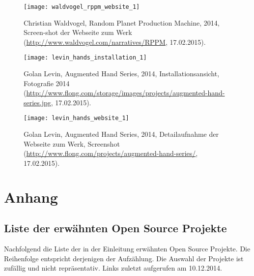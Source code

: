 \documentclass[
paper=164mm:234mm, %
pagesize, %
DIV=calc, %
10pt, %
BCOR=0mm, %
parskip=half- %
]{scrbook}
\begin{document}
\begin{figure}[H]
	\centering
	\texttt{[image: waldvogel\_rppm\_website\_1]}
	\caption{Christian Waldvogel, Random Planet Production Machine, 2014, Screen-shot der Webseite zum Werk (\url{http://www.waldvogel.com/narratives/RPPM}, 17.02.2015).}
	\label{fig:waldvogel_rppm_Webseite_1}
\end{figure}

\begin{figure}[H]
	\centering
	\texttt{[image: levin\_hands\_installation\_1]}
	\caption{Golan Levin, Augmented Hand Series, 2014, Installationsansicht, Fotografie 2014 (\url{http://www.flong.com/storage/images/projects/augmented-hand-series.jpg}, 17.02.2015).}
	\label{fig:levin_hands_installation_1}
\end{figure}

\begin{figure}[H]
	\centering
	\texttt{[image: levin\_hands\_website\_1]}
	\caption{Golan Levin, Augmented Hand Series, 2014, Detailaufnahme der Webseite zum Werk, Screenshot  (\url{http://www.flong.com/projects/augmented-hand-series/}, 17.02.2015).}
	\label{fig:levin_hands_Webseite_1}
\end{figure}


\part*{Anhang}

{}
\chapter*{Liste der erwähnten Open Source Projekte}

Nachfolgend die Liste der in der Einleitung erwähnten Open Source Projekte. Die Reihenfolge entspricht derjenigen der Aufzählung. Die Auswahl der Projekte ist zufällig und nicht repräsentativ. Links zuletzt aufgerufen am 10.12.2014.
\end{document}
